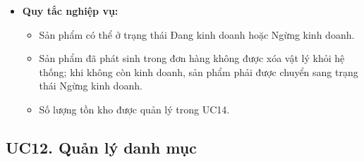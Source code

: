 \documentclass[12pt,a4paper]{article}
\begin{document}
\begin{itemize}
 \item \textbf{Quy tắc nghiệp vụ:}

 \begin{itemize}

  \item Sản phẩm có thể ở trạng thái Đang kinh doanh hoặc Ngừng kinh doanh.

  \item Sản phẩm đã phát sinh trong đơn hàng không được xóa vật lý khỏi hệ thống; khi không còn kinh doanh, sản phẩm phải được chuyển sang trạng thái Ngừng kinh doanh.

  \item Số lượng tồn kho được quản lý trong UC14.

 \end{itemize}

\end{itemize}


\subsection*{UC12. Quản lý danh mục}
\end{document}
